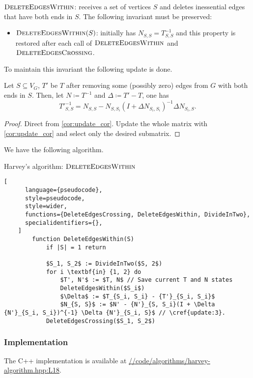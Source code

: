 \(\textsc{DeleteEdgesWithin}\): receives a set of vertices \(S\) and deletes inessential edges that have both ends in \(S\).
The following invariant must be preserved:
\begin{itemize}
    \item \(\textsc{DeleteEdgesWithin}(S)\): initially has \(N_{S, S} = T^{-1}_{S, S}\) and this property is restored after each call of \(\textsc{DeleteEdgesWithin}\)
    and \(\textsc{DeleteEdgesCrossing}\).
\end{itemize}
To maintain this invariant the following update is done.
\begin{theorem}[Update 3]
\label{update:3}
    Let \(S \subseteq V_G\), \(T'\) be \(T\) after removing some (possibly zero) edges from \(G\) with both ends in \(S\).
    Then, let \(N \coloneqq T^{-1}\) and \(\Delta \coloneqq T' - T\), one has
    \[
        {T'}^{-1}_{S, S} = N_{S, S} - N_{S, S_i}(I + \Delta N_{S_i, S_i})^{-1} \Delta N_{S_i, S}.
    \]
\end{theorem}

\begin{proof}
    Direct from \cref{cor:update_cor}. Update the whole matrix with \ref{cor:update_cor} and select only the desired submatrix.
\end{proof}

We have the following algorithm.

\begin{programruledcaption}{Harvey's algorithm: \(\textsc{DeleteEdgesWithin}\)}
    \begin{lstlisting}[
      language={pseudocode},
      style=pseudocode,
      style=wider,
      functions={DeleteEdgesCrossing, DeleteEdgesWithin, DivideInTwo},
      specialidentifiers={},
    ]
        function DeleteEdgesWithin(S)
            if |S| = 1 return

            $S_1, S_2$ := DivideInTwo($S, 2$)
            for i \textbf{in} {1, 2} do
                $T', N'$ := $T, N$ // Save current T and N states
                DeleteEdgesWithin($S_i$)
                $\Delta$ := $T_{S_i, S_i} - {T'}_{S_i, S_i}$
                $N_{S, S}$ := $N' - {N'}_{S, S_i}(I + \Delta {N'}_{S_i, S_i})^{-1} \Delta {N'}_{S_i, S}$ // \cref{update:3}. 
            DeleteEdgesCrossing($S_1, S_2$)
    \end{lstlisting}
\end{programruledcaption}

\subsubsection{Implementation}
\noindent
The C++ implementation is available at 
\href{https://github.com/antoniomsah/algebraic-max-matching/blob/main/code/algorithms/harvey-algorithm.hpp#L18}{//code/algorithms/harvey-algorithm.hpp:L18}.

